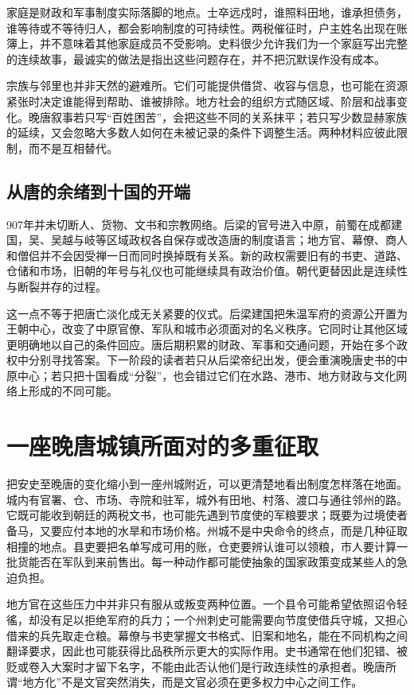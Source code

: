 家庭是财政和军事制度实际落脚的地点。士卒远戍时，谁照料田地，谁承担债务，谁等待或不等待归人，都会影响制度的可持续性。两税催征时，户主姓名出现在账簿上，并不意味着其他家庭成员不受影响。史料很少允许我们为一个家庭写出完整的连续故事，最诚实的做法是指出这些问题存在，并不把沉默误作没有成本。

宗族与邻里也并非天然的避难所。它们可能提供借贷、收容与信息，也可能在资源紧张时决定谁能得到帮助、谁被排除。地方社会的组织方式随区域、阶层和战事变化。晚唐叙事若只写“百姓困苦”，会把这些不同的关系抹平；若只写少数显赫家族的延续，又会忽略大多数人如何在未被记录的条件下调整生活。两种材料应彼此限制，而不是互相替代。

\subsection{从唐的余绪到十国的开端}
907年并未切断人、货物、文书和宗教网络。后梁的官号进入中原，前蜀在成都建国，吴、吴越与岐等区域政权各自保存或改造唐的制度语言；地方官、幕僚、商人和僧侣并不会因受禅一日而同时换掉既有关系。新的政权需要旧有的书吏、道路、仓储和市场，旧朝的年号与礼仪也可能继续具有政治价值。朝代更替因此是连续性与断裂并存的过程。

这一点不等于把唐亡淡化成无关紧要的仪式。后梁建国把朱温军府的资源公开置为王朝中心，改变了中原官僚、军队和城市必须面对的名义秩序。它同时让其他区域更明确地以自己的条件回应。唐后期积累的财政、军事和交通问题，开始在多个政权中分别寻找答案。下一阶段的读者若只从后梁帝纪出发，便会重演晚唐史书的中原中心；若只把十国看成“分裂”，也会错过它们在水路、港市、地方财政与文化网络上形成的不同可能。

\section{一座晚唐城镇所面对的多重征取}

把安史至晚唐的变化缩小到一座州城附近，可以更清楚地看出制度怎样落在地面。城内有官署、仓、市场、寺院和驻军，城外有田地、村落、渡口与通往邻州的路。它既可能收到朝廷的两税文书，也可能先遇到节度使的军粮要求；既要为过境使者备马，又要应付本地的水旱和市场价格。州城不是中央命令的终点，而是几种征取相撞的地点。县吏要把名单写成可用的账，仓吏要辨认谁可以领粮，市人要计算一批货能否在军队到来前售出。每一种动作都可能使抽象的国家政策变成某些人的急迫负担。

地方官在这些压力中并非只有服从或叛变两种位置。一个县令可能希望依照诏令轻徭，却没有足以拒绝军府的兵力；一个州刺史可能需要向节度使借兵守城，又担心借来的兵先取走仓粮。幕僚与书吏掌握文书格式、旧案和地名，能在不同机构之间翻译要求，因此也可能获得比品秩所示更大的实际作用。史书通常在他们犯错、被贬或卷入大案时才留下名字，不能由此否认他们是行政连续性的承担者。晚唐所谓“地方化”不是文官突然消失，而是文官必须在更多权力中心之间工作。

